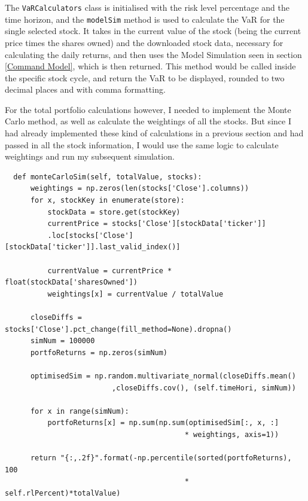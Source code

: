 \documentclass{article}
\begin{document}
\vspace{0.3cm}
The \texttt{VaRCalculators} class is initialised with the risk level percentage and the time horizon, and the \texttt{modelSim} method is used to calculate the VaR for the single selected stock. It takes in the current value of the stock (being the current price times the shares owned) and the downloaded stock data, necessary for calculating the daily returns, and then uses the  Model Simulation seen in section \ref{Command Model}, which is then returned. This method would be called inside the specific stock cycle, and return the VaR to be displayed, rounded to two decimal places and with comma formatting.\\\vspace{0.3cm}

For the total portfolio calculations however, I needed to implement the Monte Carlo method, as well as calculate the weightings of all the stocks. But since I had already implemented these kind of calculations in a previous section and had passed in all the stock information, I would use the same logic to calculate weightings and run my subsequent simulation.\\\vspace{0.3cm}

\begin{verbatim}
  def monteCarloSim(self, totalValue, stocks):
      weightings = np.zeros(len(stocks['Close'].columns))
      for x, stockKey in enumerate(store):
          stockData = store.get(stockKey)
          currentPrice = stocks['Close'][stockData['ticker']]
          .loc[stocks['Close'][stockData['ticker']].last_valid_index()]

          currentValue = currentPrice * float(stockData['sharesOwned'])
          weightings[x] = currentValue / totalValue
  
      closeDiffs = stocks['Close'].pct_change(fill_method=None).dropna()
      simNum = 100000
      portfoReturns = np.zeros(simNum)
  
      optimisedSim = np.random.multivariate_normal(closeDiffs.mean() 
                         ,closeDiffs.cov(), (self.timeHori, simNum)) 

      for x in range(simNum): 
          portfoReturns[x] = np.sum(np.sum(optimisedSim[:, x, :] 
                                          * weightings, axis=1))
          
      return "{:,.2f}".format(-np.percentile(sorted(portfoReturns), 100 
                                          * self.rlPercent)*totalValue)
\end{verbatim}
\end{document}
